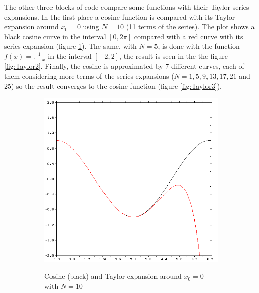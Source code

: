 The other three blocks of code compare some functions with their Taylor series expansions. In the first place a cosine function is compared with its Taylor expansion around $x_0 = 0$ using $N = 10$ (11 terms of the series). The plot shows a black cosine curve in the interval $\left[0,2\pi\right]$ compared with a red curve with its series expansion (figure \ref{fig:Taylor1}). The same, with $N = 5$, is done with the function $f(x) = \frac{1}{1-x}$ in the interval $\left[-2,2\right]$, the result is seen in the the figure \ref{fig:Taylor2}. Finally, the cosine is approximated by 7 different curves, each of them considering more terms of the series expansions ($N = 1, 5, 9, 13, 17, 21$ and $25$) so the result converges to the cosine function (figure \ref{fig:Taylor3}). 

\begin{figure}
    \begin{subfigure}[h]{0.5\textwidth}
        \centering
        \includegraphics[width = \textwidth]{./doc/Figures/Taylor1.png}  \\
        \caption{Cosine (black) and Taylor expansion around $x_0 = 0$ with $N = 10$}
        \label{fig:Taylor1}
    \end{subfigure}
    \hspace{\fill}
    \begin{subfigure}[h]{0.5\textwidth}
        \centering

\end{subfigure}
\end{figure}
